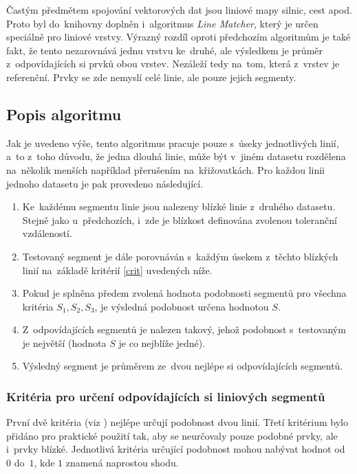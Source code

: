 Častým předmětem spojování vektorových dat jsou liniové mapy silnic, cest apod.
Proto byl do~knihovny doplněn i~algoritmus \textit{Line Matcher}, který je
určen speciálně pro liniové vrstvy. Výrazný rozdíl oproti předchozím algoritmům
je také fakt, že tento nezarovnává jednu vrstvu ke~druhé, ale výsledkem je
průměr z~odpovídajících si prvků obou vrstev. Nezáleží tedy na~tom, která 
z~vrstev je referenční. Prvky se zde nemyslí celé linie, ale pouze jejich
segmenty.

\subsection{Popis algoritmu}
\label{lm-algoritmus}

Jak je uvedeno výše, tento algoritmus pracuje pouze s~úseky jednotlivých
linií, a~to z~toho důvodu, že jedna dlouhá linie, může být v~jiném datasetu
rozdělena na~několik menších například přerušením na~křižovatkách. Pro každou
linii jednoho datasetu je pak provedeno následující. 

\begin{enumerate}
 \item Ke~každému segmentu linie jsou nalezeny blízké linie z~druhého datasetu.
       Stejně jako u~předchozích, i~zde je blízkost definována zvolenou toleranční
       vzdáleností.
 \item Testovaný segment je dále porovnáván s~každým úsekem z~těchto blízkých
       linií na~zá\-kladě kritérií \ref{crit} uvedených níže.
 \item Pokud je splněna předem zvolená hodnota podobnosti segmentů pro všechna 
       kritéria $S_1,S_2,S_3$, je výsledná podobnost určena hodnotou $S$.
 \item Z~odpovídajících segmentů je nalezen takový, jehož podobnost s~testovaným
       je největší (hodnota $S$ je co nejblíže jedné).
 \item Výsledný segment je průměrem ze~dvou nejlépe si odpovídajících segmentů.
\end{enumerate}

\subsubsection*{Kritéria pro určení odpovídajících si liniových segmentů}
První dvě kritéria (viz \cite{moosavi}) nejlépe určují podobnost dvou 
linií. Třetí kritérium bylo přidáno pro praktické použití tak, aby se neurčovaly
pouze podobné prvky, ale i~prvky blízké. Jednotlivá kritéria určující podobnost 
mohou nabývat hodnot od~$0$ do~$1$, kde $1$ znamená naprostou shodu.

